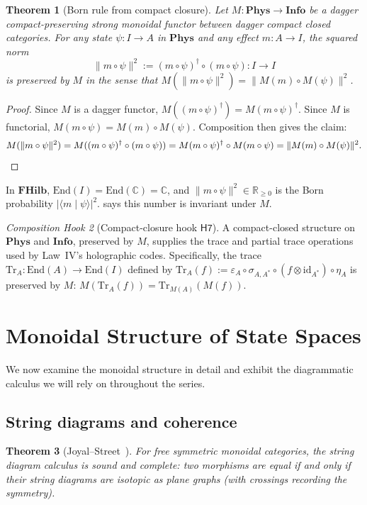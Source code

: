 \documentclass[12pt]{article}
\newtheorem{theorem}{Theorem}[section]
\theoremstyle{definition}
\theoremstyle{remark}
\newtheorem{hook}[theorem]{Composition Hook}
\newcommand{\Phys}{\mathbf{Phys}}
\newcommand{\Info}{\mathbf{Info}}
\newcommand{\FHilb}{\mathbf{FHilb}}
\newcommand{\id}{\mathrm{id}}
\newcommand{\End}{\mathrm{End}}
\newcommand{\Tr}{\mathrm{Tr}}
\begin{document}
\begin{theorem}[Born rule from compact closure]
\label{thm:born}
Let $M : \Phys \to \Info$ be a dagger compact-preserving strong monoidal functor between dagger compact closed categories. For any state $\psi : I \to A$ in $\Phys$ and any effect $m : A \to I$, the squared norm
\[
\|m \circ \psi\|^2 := (m \circ \psi)^\dagger \circ (m \circ \psi) : I \to I
\]
is preserved by $M$ in the sense that $M(\|m \circ \psi\|^2) = \|M(m) \circ M(\psi)\|^2$.
\end{theorem}

\begin{proof}
Since $M$ is a dagger functor, $M((m \circ \psi)^\dagger) = M(m \circ \psi)^\dagger$. Since $M$ is functorial, $M(m \circ \psi) = M(m) \circ M(\psi)$. Composition then gives the claim:
\[
M(\|m \circ \psi\|^2) = M((m \circ \psi)^\dagger \circ (m \circ \psi)) = M(m \circ \psi)^\dagger \circ M(m \circ \psi) = \|M(m) \circ M(\psi)\|^2. \qedhere
\]
\end{proof}

In $\FHilb$, $\End(I) = \End(\mathbb{C}) = \mathbb{C}$, and $\|m \circ \psi\|^2 \in \mathbb{R}_{\geq 0}$ is the Born probability $|\langle m \mid \psi\rangle|^2$.  says this number is invariant under $M$.

\begin{hook}[Compact-closure hook $\mathsf{H7}$]
\label{hook:H7}
A compact-closed structure on $\Phys$ and $\Info$, preserved by $M$, supplies the trace and partial trace operations used by Law~IV's holographic codes. Specifically, the trace $\Tr_A : \End(A) \to \End(I)$ defined by $\Tr_A(f) := \varepsilon_A \circ \sigma_{A,A^*} \circ (f \otimes \id_{A^*}) \circ \eta_A$ is preserved by $M$: $M(\Tr_A(f)) = \Tr_{M(A)}(M(f))$.
\end{hook}

\section{Monoidal Structure of State Spaces}
\label{sec:monoidal}

We now examine the monoidal structure in detail and exhibit the diagrammatic calculus we will rely on throughout the series.

\subsection{String diagrams and coherence}

\begin{theorem}[Joyal--Street~\cite{joyalstreet1991}]
\label{thm:joyal-street}
For free symmetric monoidal categories, the string diagram calculus is sound and complete: two morphisms are equal if and only if their string diagrams are isotopic as plane graphs (with crossings recording the symmetry).
\end{theorem}
\end{document}
